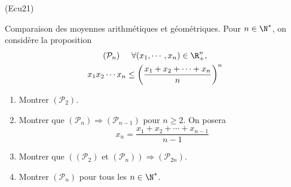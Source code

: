 \begin{tiny}(Ecu21)\end{tiny} Comparaison des moyennes arithmétiques et géométriques.\newline
Pour $n\in \N^*$, on considère la proposition 
\begin{multline*}
(\mathcal{P}_n)\hspace{0.5cm}
\forall (x_1,\cdots,x_n)\in \R_{+}^{n}, \\
x_1x_2\cdots x_n \leq \left( \frac{x_1+x_2+\cdots+x_n}{n}\right)^n 
\end{multline*}

\begin{enumerate}
  \item Montrer $(\mathcal{P}_2)$.
  \item Montrer que $(\mathcal{P}_n)\Rightarrow (\mathcal{P}_{n-1})$ pour $n\geq 2$. On posera 
  \begin{displaymath}
    x_n = \frac{x_1+x_2+\cdots +x_{n-1}}{n-1}
  \end{displaymath}
  \item Montrer que $\left((\mathcal{P}_{2}) \text{ et } (\mathcal{P}_{n})\right) \Rightarrow (\mathcal{P}_{2n})$.
  \item Montrer $(\mathcal{P}_{n})$ pour tous les $n\in \N^*$.
\end{enumerate}
